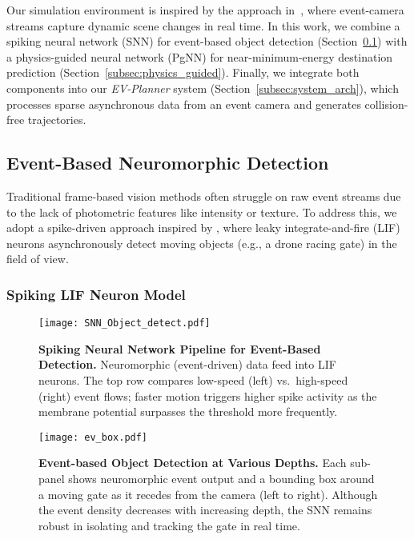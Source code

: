 \label{subsec:sim_setup}
Our simulation environment is inspired by the approach in~\cite{evplanner}, where event-camera streams capture dynamic scene changes in real time. In this work, we combine a spiking neural network (SNN) for event-based object detection (Section~\ref{subsec:neuromorphic_detection}) with a physics-guided neural network (PgNN) for near-minimum-energy destination prediction (Section~\ref{subsec:physics_guided}). Finally, we integrate both components into our \emph{EV-Planner} system (Section~\ref{subsec:system_arch}), which processes sparse asynchronous data from an event camera and generates collision-free trajectories. 

\subsection{\textbf{Event-Based Neuromorphic Detection}}
\label{subsec:neuromorphic_detection}

Traditional frame-based vision methods often struggle on raw event streams due to the lack of photometric features like intensity or texture. To address this, we adopt a spike-driven approach inspired by \cite{nagaraj2023dotie}, where leaky integrate-and-fire (LIF) neurons asynchronously detect moving objects (e.g., a drone racing gate) in the field of view.

\subsubsection{Spiking LIF Neuron Model}
\label{sec:snn_model}

\begin{figure*}[t]
    \centering
    \texttt{[image: SNN\_Object\_detect.pdf]}
    \caption{%
        \textbf{Spiking Neural Network Pipeline for Event-Based Detection.} 
        Neuromorphic (event-driven) data feed into LIF neurons. 
        The top row compares low-speed (left) vs.\ high-speed (right) event flows; 
        faster motion triggers higher spike activity as the membrane potential 
        surpasses the threshold more frequently.
    }
    \label{fig:SNN_Object_detect}
\end{figure*}
\begin{figure*}[t]
    \centering
    \texttt{[image: ev\_box.pdf]}
    \caption{%
        \textbf{Event-based Object Detection at Various Depths.} 
        Each sub-panel shows neuromorphic event output and a bounding box 
        around a moving gate as it recedes from the camera (left to right). 
        Although the event density decreases with increasing depth, 
        the SNN remains robust in isolating and tracking the gate in real time.
    }
    \label{fig:ev_box}
\end{figure*}

